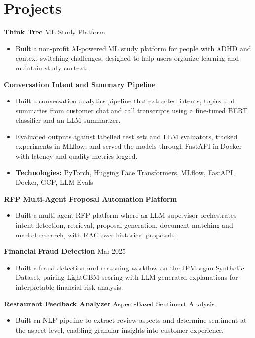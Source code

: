 \documentclass[10pt,a4paper]{article}
\begin{document}
\section{Projects}
\textbf{Think Tree} \textbar{} ML Study Platform\par
\begin{itemize}
  \item Built a non-profit AI-powered ML study platform for people with ADHD and context-switching challenges, designed to help users organize learning and maintain study context.
\end{itemize}
\textbf{Conversation Intent and Summary Pipeline}\par
\begin{itemize}
  \item Built a conversation analytics pipeline that extracted intents, topics and summaries from customer chat and call transcripts using a fine-tuned BERT classifier and an LLM summarizer.
  \item Evaluated outputs against labelled test sets and LLM evaluators, tracked experiments in MLflow, and served the models through FastAPI in Docker with latency and quality metrics logged.
  \item \textbf{Technologies:} PyTorch, Hugging Face Transformers, MLflow, FastAPI, Docker, GCP, LLM Evals
\end{itemize}
\textbf{RFP Multi-Agent Proposal Automation Platform}\par
\begin{itemize}
  \item Built a multi-agent RFP platform where an LLM supervisor orchestrates intent detection, retrieval, proposal generation, document matching and market research, with RAG over historical proposals.
\end{itemize}
\textbf{Financial Fraud Detection} \textbar{} Mar 2025\par
\begin{itemize}
  \item Built a fraud detection and reasoning workflow on the JPMorgan Synthetic Dataset, pairing LightGBM scoring with LLM-generated explanations for interpretable financial-risk analysis.
\end{itemize}
\textbf{Restaurant Feedback Analyzer} \textbar{} Aspect-Based Sentiment Analysis\par
\begin{itemize}
  \item Built an NLP pipeline to extract review aspects and determine sentiment at the aspect level, enabling granular insights into customer experience.
\end{itemize}
\end{document}
